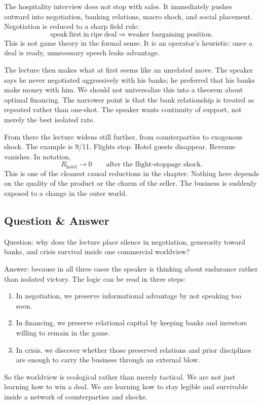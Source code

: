 The hospitality interview does not stop with sales. It immediately pushes outward into negotiation, banking relations, macro shock, and social placement. Negotiation is reduced to a sharp field rule:
\begin{equation}
\mathrm{speak\ first\ in\ ripe\ deal} \Rightarrow \text{weaker bargaining position}.
\end{equation}
This is not game theory in the formal sense. It is an operator's heuristic: once a deal is ready, unnecessary speech leaks advantage.

The lecture then makes what at first seems like an unrelated move. The speaker says he never negotiated aggressively with his banks; he preferred that his banks make money with him. We should not universalize this into a theorem about optimal financing. The narrower point is that the bank relationship is treated as repeated rather than one-shot. The speaker wants continuity of support, not merely the best isolated rate.

From there the lecture widens still further, from counterparties to exogenous shock. The example is 9/11. Flights stop. Hotel guests disappear. Revenue vanishes. In notation,
\begin{equation}
R_{\text{hotel}} \to 0 \qquad \text{after the flight-stoppage shock.}
\end{equation}
This is one of the cleanest causal reductions in the chapter. Nothing here depends on the quality of the product or the charm of the seller. The business is suddenly exposed to a change in the outer world.

\subsection{Question \& Answer}

Question: why does the lecture place silence in negotiation, generosity toward banks, and crisis survival inside one commercial worldview?

Answer: because in all three cases the speaker is thinking about endurance rather than isolated victory. The logic can be read in three steps:
\begin{enumerate}
\item In negotiation, we preserve informational advantage by not speaking too soon.
\item In financing, we preserve relational capital by keeping banks and investors willing to remain in the game.
\item In crisis, we discover whether those preserved relations and prior disciplines are enough to carry the business through an external blow.
\end{enumerate}
So the worldview is ecological rather than merely tactical. We are not just learning how to win a deal. We are learning how to stay legible and survivable inside a network of counterparties and shocks.

